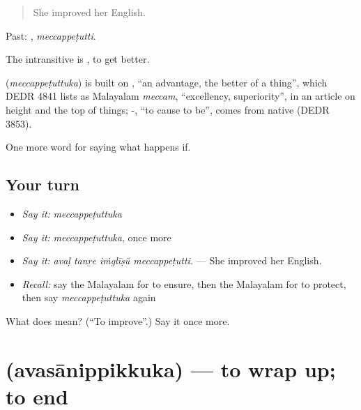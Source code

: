 \begin{quote}
She improved her English.
\end{quote}

Past: , \emph{meccappeṭutti}.

The intransitive is , to get better.

\begin{cousinweb}
\textbf{} (\emph{meccappeṭuttuka}) is built on , \textquotedblleft{}an advantage, the better of a thing\textquotedblright{}, which DEDR 4841 lists as Malayalam \emph{meccam}, \textquotedblleft{}excellency, superiority\textquotedblright{}, in an article on height and the top of things; -, \textquotedblleft{}to cause to be\textquotedblright{}, comes from native  (DEDR 3853).
\end{cousinweb}

\begin{grammarlens}[title={What you've built}]
One more word for saying what happens if.
\end{grammarlens}

\subsection*{Your turn}
\begin{itemize}
\raggedright
  \item \emph{Say it:} \emph{meccappeṭuttuka}
  \item \emph{Say it:} \emph{meccappeṭuttuka}, once more
  \item \emph{Say it:} \emph{avaḷ tanṟe iṁglīṣŭ meccappeṭutti.} — She improved her English.
  \item \emph{Recall:} say the Malayalam for to ensure, then the Malayalam for to protect, then say \emph{meccappeṭuttuka} again
\end{itemize}

\begin{tcolorbox}[breakable,colback=teal!4,colframe=teal!35!black,title={Before you move on}]
What does  mean? (\textquotedblleft{}To improve\textquotedblright{}.) Say it once more.
\end{tcolorbox}
\section[\texorpdfstring{\ml{അവസാനിപ്പിക്കുക} (avasānippikkuka)}{അവസാനിപ്പിക്കുക (avasānippikkuka)}]{ (avasānippikkuka) — to wrap up; to end}

